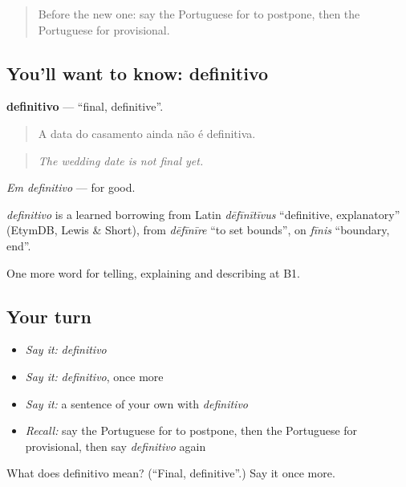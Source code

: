 \begin{quote}
Before the new one: say the Portuguese for to postpone, then the Portuguese for provisional.
\end{quote}

\subsection*{You'll want to know: definitivo}
\textbf{definitivo} — \textquotedblleft{}final, definitive\textquotedblright{}.

\begin{quote}
A data do casamento ainda não é definitiva.
\end{quote}

\begin{quote}
\emph{The wedding date is not final yet.}
\end{quote}

\emph{Em definitivo} — for good.

\begin{cousinweb}
\emph{definitivo} is a learned borrowing from Latin \emph{dēfīnītīvus} \textquotedblleft{}definitive, explanatory\textquotedblright{} (EtymDB, Lewis \& Short), from \emph{dēfīnīre} \textquotedblleft{}to set bounds\textquotedblright{}, on \emph{fīnis} \textquotedblleft{}boundary, end\textquotedblright{}.
\end{cousinweb}

\begin{grammarlens}[title={What you've built}]
One more word for telling, explaining and describing at B1.
\end{grammarlens}

\subsection*{Your turn}
\begin{itemize}
\raggedright
  \item \emph{Say it:} \emph{definitivo}
  \item \emph{Say it:} \emph{definitivo}, once more
  \item \emph{Say it:} a sentence of your own with \emph{definitivo}
  \item \emph{Recall:} say the Portuguese for to postpone, then the Portuguese for provisional, then say \emph{definitivo} again
\end{itemize}

\begin{tcolorbox}[breakable,colback=teal!4,colframe=teal!35!black,title={Before you move on}]
What does definitivo mean? (\textquotedblleft{}Final, definitive\textquotedblright{}.) Say it once more.
\end{tcolorbox}
